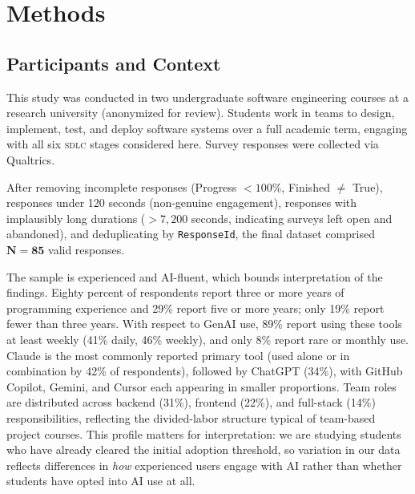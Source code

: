 \documentclass[sigconf,anonymous]{acmart}
\newcommand{\SDLC}{\textsc{sdlc}\xspace}
\newcommand{\GenAI}{GenAI\xspace}
\begin{document}
\section{Methods}
\label{sec:methods}

\subsection{Participants and Context}
This study was conducted in two undergraduate software engineering courses
at a research university (anonymized for review). Students work in teams
to design, implement, test, and deploy software systems over a full
academic term, engaging with all six \SDLC stages considered here. Survey
responses were collected via Qualtrics.

After removing incomplete responses (Progress $< 100\%$, Finished $\neq$
True), responses under 120 seconds (non-genuine engagement), responses
with implausibly long durations ($> 7{,}200$ seconds, indicating surveys
left open and abandoned), and deduplicating by \texttt{ResponseId}, the
final dataset comprised $\mathbf{N = 85}$ valid responses.

The sample is experienced and AI-fluent, which bounds interpretation of
the findings. Eighty percent of respondents report three or more years
of programming experience and 29\% report five or more years; only 19\%
report fewer than three years. With respect to \GenAI use, 89\% report
using these tools at least weekly (41\% daily, 46\% weekly), and only
8\% report rare or monthly use. Claude is the most commonly reported
primary tool (used alone or in combination by 42\% of respondents),
followed by ChatGPT (34\%), with GitHub Copilot, Gemini, and Cursor
each appearing in smaller proportions. Team roles are distributed
across backend (31\%), frontend (22\%), and full-stack (14\%)
responsibilities, reflecting the divided-labor structure typical of
team-based project courses. This profile matters for interpretation:
we are studying students who have already cleared the initial adoption
threshold, so variation in our data reflects differences in \emph{how}
experienced users engage with AI rather than whether students have
opted into AI use at all.
\end{document}

